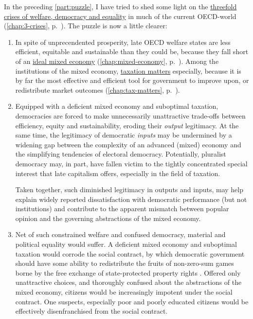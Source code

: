 In the preceding \autoref{part:puzzle}, I have tried to shed some light on the \hyperref[chap:3-crises]{threefold crises of welfare, democracy and equality} in much of the current \gls{OECD}-world (\autoref{chap:3-crises}, p.~\pageref{chap:3-crises}).
The puzzle is now a little clearer:

\begin{enumerate}
	\item In spite of unprecendented prosperity, late \gls{OECD} welfare states are less efficient, equitable and sustainable than they could be, because they fall short of an \hyperref[chap:mixed-economy]{ideal mixed economy} (\autoref{chap:mixed-economy}, p.~\pageref{chap:mixed-economy}).
	Among the institutions of the mixed economy, \hyperref[chap:tax-matters]{taxation matters} especially, because it is by far the most effective and efficient tool for government to improve upon, or redistribute market outcomes (\autoref{chap:tax-matters}, p.~\pageref{chap:tax-matters}).

	\item Equipped with a deficient mixed economy and suboptimal taxation, democracies are forced to make unnecessarily unattractive trade-offs between efficiency, equity and sustainability, eroding their \emph{output} legitimacy.
	At the same time, the legitimacy of democratic \emph{inputs} may be undermined by a widening gap between the complexity of an advanced (mixed) economy and the simplifying tendencies of electoral democracy.
	Potentially, pluralist democracy may, in part, have fallen victim to the tightly concentrated special interest that late capitalism offers, especially in the field of taxation.

	Taken together, such diminished legitimacy in outputs and inputs, may help explain widely reported dissatisfaction with democratic performance (but not institutions) \citep[for example,][]{Dalton-2004-aa} and contribute to the apparent mismatch between popular opinion and the governing abstractions of the mixed economy.

	\item Net of such constrained welfare and confused democracy, material and political equality would suffer.
	A deficient mixed economy and suboptimal taxation would corrode the social contract, by which democratic government should have some ability to redistribute the fruits of non-zero-sum %
	games borne by the free exchange of state-protected property rights \citep[compare][]{Crouch2004}.
	Offered only unattractive choices, and thoroughly confused about the abstractions of the mixed economy, citizens would be increasingly impotent under the social contract.
	One suspects, especially poor and poorly educated citizens would be effectively disenfranchised from the social contract.
\end{enumerate}


